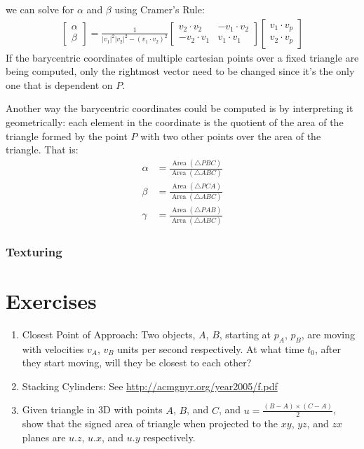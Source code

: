 \documentclass[12pt]{report}
\DeclareMathOperator{\Area}{Area}
\begin{document}
we can solve for $\alpha$ and $\beta$ using Cramer's Rule:
\begin{align}
	\begin{bmatrix}
	\alpha \\ \beta
	\end{bmatrix} =
	\frac{1}{|v_1|^2|v_2|^2 - (v_1 \cdot v_2)^2}
	\begin{bmatrix}
	v_2 \cdot v_2  & -v_1 \cdot v_2 \\
	-v_2 \cdot v_1 & v_1 \cdot v_1  
	\end{bmatrix}
	\begin{bmatrix}
	v_1 \cdot v_p \\
	v_2 \cdot v_p
	\end{bmatrix}
\end{align}
If the barycentric coordinates of multiple cartesian points over a fixed triangle are being computed, only the rightmost vector need to be changed since it's the only one that is dependent on $P$.
	
	Another way the barycentric coordinates could be computed is by interpreting it geometrically: each element in the coordinate is the quotient of the area of the triangle formed by the point $P$ with two other points over the area of the triangle. That is:
	\begin{align*}
	\alpha &= \frac{\Area(\triangle PBC)}{\Area(\triangle ABC)}\\
	\beta &= \frac{\Area(\triangle PCA)}{\Area(\triangle ABC)}\\
	\gamma &= \frac{\Area(\triangle PAB)}{\Area(\triangle ABC)}
	\end{align*}

\subsubsection{Texturing}
\section{Exercises}
\begin{enumerate}
	\item Closest Point of Approach: Two objects, $A$, $B$, starting at $p_A$, $p_B$, are moving with velocities $v_A$, $v_B$ units per second respectively. At what time $t_0$, after they start moving, will they be closest to each other?
	\item Stacking Cylinders: See \url{http://acmgnyr.org/year2005/f.pdf}
	\item Given triangle in 3D with points $A$, $B$, and $C$, and $u = \frac{(B - A)\times (C - A)}{2}$, show that the signed area of triangle when projected to the $xy$, $yz$, and $zx$ planes are $u.z$, $u.x$, and $u.y$ respectively.
\end{enumerate}
\end{document}
